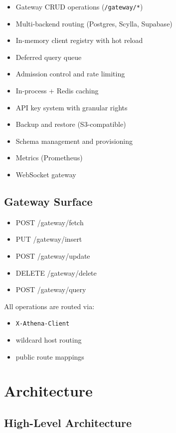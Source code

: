 \documentclass[11pt,a4paper]{article}
\begin{document}
\begin{itemize}
\item Gateway CRUD operations (\texttt{/gateway/*})
\item Multi-backend routing (Postgres, Scylla, Supabase)
\item In-memory client registry with hot reload
\item Deferred query queue
\item Admission control and rate limiting
\item In-process + Redis caching
\item API key system with granular rights
\item Backup and restore (S3-compatible)
\item Schema management and provisioning
\item Metrics (Prometheus)
\item WebSocket gateway
\end{itemize}

\subsection{Gateway Surface}

\begin{itemize}
\item POST /gateway/fetch
\item PUT /gateway/insert
\item POST /gateway/update
\item DELETE /gateway/delete
\item POST /gateway/query
\end{itemize}

All operations are routed via:

\begin{itemize}
\item \texttt{X-Athena-Client}
\item wildcard host routing
\item public route mappings
\end{itemize}

\newpage

\section{Architecture}

\subsection{High-Level Architecture}
\end{document}
